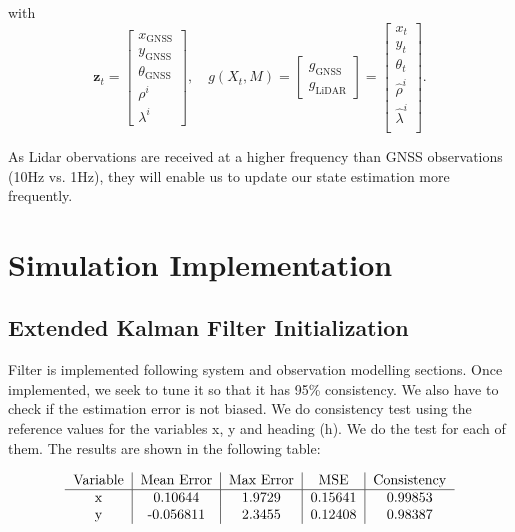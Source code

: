 \documentclass[conference]{IEEEtran}
\begin{document}
with
\[
\mathbf{z}_t =
\begin{bmatrix}
x_\text{GNSS} \\
y_\text{GNSS} \\
\theta_\text{GNSS} \\
\rho^{i} \\
\lambda^{i}
\end{bmatrix}, \quad
g(X_t, M) =
\begin{bmatrix}
g_\text{GNSS} \\
g_\text{LiDAR}
\end{bmatrix} = 
\begin{bmatrix}
x_t \\
y_t \\
\theta_t \\
\hat{\rho}^{i} \\
\hat{\lambda}^{i} \\
\end{bmatrix}.
\]

\vspace{3mm}

\noindent As Lidar obervations are received at a higher frequency than GNSS observations (10Hz vs. 1Hz), they will enable us to update our state estimation more frequently.

\section{Simulation Implementation}

\subsection{Extended Kalman Filter Initialization}

Filter is implemented following system and observation modelling sections. Once implemented, we seek to tune it so that it has 95\% consistency. We also have to check if the estimation error is not biased. We do consistency test using the reference values for the variables x, y and heading (h). We do the test for each of them. The results are shown in the following table:

\begin{align*}
\begin{tabular}{c|c|c|c|c} 
  Variable & Mean Error & Max Error & MSE & Consistency \\ \hline 
  x & 0.10644 & 1.9729 & 0.15641 & 0.99853 \\
  y   & -0.056811 & 2.3455 &  0.12408 & 0.98387\\
\end{tabular}
\end{align*}
\end{document}
